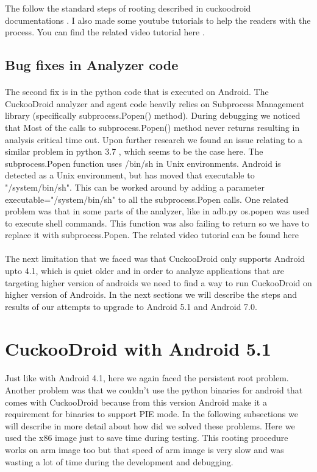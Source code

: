 \documentclass[../main.tex]{subfile}
\begin{document}
		The follow the standard steps of rooting described in cuckoodroid documentations \cite{cuckoodroid_docs}. I also made some youtube tutorials to help the readers with the process. You can find the related video tutorial here \cite{rooting_youtube}.
		
				
		\subsection{Bug fixes in Analyzer code}
		\paragraph{} The second fix is in the python code that is executed on Android. The CuckooDroid analyzer and agent code heavily relies on Subprocess Management library \cite{subprocess_management_library} (specifically subprocess.Popen() method). During debugging we noticed that Most of the calls to subprocess.Popen() method never returns resulting in analysis critical time out. Upon further research we found an issue relating to a similar problem in python 3.7 \cite{subprocess.popen_issue16255}, which seems to be the case here. The subprocess.Popen function uses /bin/sh in Unix environments. Android is detected as a Unix environment, but has moved that executable to "/system/bin/sh". This can be worked around by adding a parameter executable="/system/bin/sh" to all the subprocess.Popen calls. One related problem was that in some parts of the analyzer, like in adb.py os.popen was used to execute shell commands. This function was also failing to return so we have to replace it with subprocess.Popen. The related video tutorial can be found here \cite{subprocess_youtube}
		
		\paragraph{} The next limitation that we faced was that CuckooDroid only supports Android upto 4.1, which is quiet older and in order to analyze applications that are targeting higher version of androids we need to find a way to run CuckooDroid on higher version of Androids. In the next sections we will describe the steps and results of our attempts to upgrade to Android 5.1 and Android 7.0.

		\section{CuckooDroid with Android 5.1}
		\paragraph{} Just like with Android 4.1, here we again faced the persistent root problem. Another problem was that we couldn't use the python binaries for android that comes with CuckooDroid because from this version Android make it a requirement for binaries to support PIE mode. In the following subsections we will describe in more detail about how did we solved these problems. Here we used the x86 image just to save time during testing. This rooting procedure works on arm image too but that speed of arm image is very slow and was wasting a lot of time during the development and debugging.
		
\end{document}
